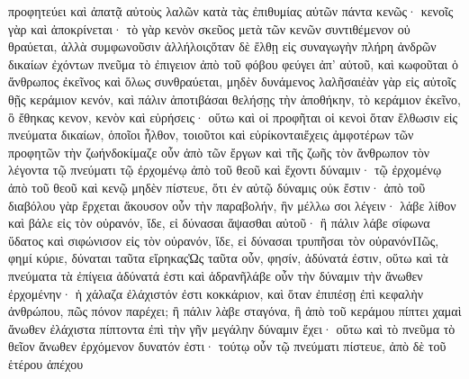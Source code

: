 προφητεύει καὶ ἀπατᾷ αὐτοὺς λαλῶν κατὰ τὰς ἐπιθυμίας αὐτῶν πάντα κενῶς· κενοῖς γὰρ καὶ ἀποκρίνεται· τὸ γὰρ κενὸν σκεῦος μετὰ τῶν κενῶν συντιθέμενον οὐ θραύεται, ἀλλὰ συμφωνοῦσιν ἀλλήλοιςὅταν δὲ ἔλθῃ εἰς συναγωγὴν πλήρη ἀνδρῶν δικαίων ἐχόντων πνεῦμα τὸ ἐπιγειον ἀπὸ τοῦ φόβου φεύγει ἀπ’ αὐτοῦ, καὶ κωφοῦται ὁ ἄνθρωπος ἐκεῖνος καὶ ὅλως συνθραύεται, μηδὲν δυνάμενος λαλῆσαιἐὰν γὰρ εἰς αὐτοῖς θῇς κεράμιον κενόν, καὶ πάλιν ἀποτιβάσαι θελήσῃς τὴν ἀποθήκην, τὸ κεράμιον ἐκεῖνο, ὃ ἔθηκας κενον, κενὸν καὶ εὑρήσεις· οὕτω καὶ οἱ προφῆται οἱ κενοὶ ὅταν ἔλθωσιν εἰς πνεύματα δικαίων, ὁποῖοι ἦλθον, τοιοῦτοι καὶ εὑρίκονταιἔχεις ἀμφοτέρων τῶν προφητῶν τὴν ζωήνδοκίμαζε οὖν ἀπὸ τῶν ἔργων καὶ τῆς ζωῆς τὸν ἄνθρωπον τὸν λέγοντα τῷ πνεύματι τῷ ἐρχομένῳ ἀπὸ τοῦ θεοῦ καὶ ἔχοντι δύναμιν· τῷ ἐρχομένῳ ἀπὸ τοῦ θεοῦ καὶ κενῷ μηδὲν πίστευε, ὅτι ἐν αὐτῷ δύναμις οὐκ ἔστιν· ἀπὸ τοῦ διαβόλου γὰρ ἔρχεται ἄκουσον οὖν τὴν παραβολήν, ἣν μέλλω σοι λέγειν· λάβε λίθον καὶ βάλε εἰς τὸν οὐρανόν, ἴδε, εἰ δύνασαι ἅψασθαι αὐτοῦ· ἢ πάλιν λάβε σίφωνα ὕδατος καὶ σιφώνισον εἰς τὸν οὐρανόν, ἴδε, εἰ δύνασαι τρυπῆσαι τὸν οὐρανόνΠῶς, φημί κύριε, δύναται ταῦτα εἴρηκαςὩς ταῦτα οὖν, φησίν, ἀδύνατά ἐστιν, οὕτω καὶ τὰ πνεύματα τὰ ἐπίγεια ἀδύνατά ἐστι καὶ ἀδρανῆλάβε οὖν τὴν δύναμιν τὴν ἄνωθεν ἐρχομένην· ἡ χάλαζα ἐλάχιστόν ἐστι κοκκάριον, καὶ ὅταν ἐπιπέσῃ ἐπὶ κεφαλὴν ἀνθρώπου, πῶς πόνον παρέχει; ἢ πάλιν λὰβε σταγόνα, ἢ ἀπὸ τοῦ κεράμου πίπτει χαμαὶ ἄνωθεν ἐλάχιστα πίπτοντα ἐπὶ τὴν γῆν μεγάλην δύναμιν ἔχει· οὕτω καὶ τὸ πνεῦμα τὸ θεῖον ἄνωθεν ἐρχόμενον δυνατόν ἐστι· τούτῳ οὖν τῷ πνεύματι πίστευε, ἀπὸ δὲ τοῦ ἑτέρου ἀπέχου

